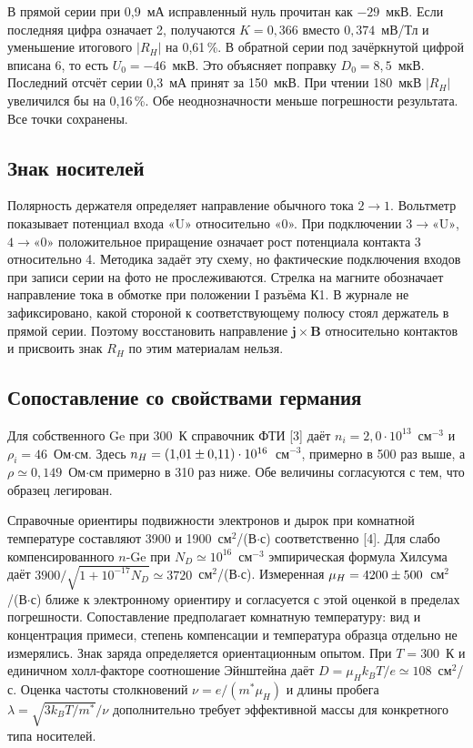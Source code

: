 \documentclass[a4paper,12pt]{article}
\begin{document}
В прямой серии при 0,9~мА исправленный нуль прочитан как $-29$~мкВ. Если последняя цифра означает 2, получаются $K=0{,}366$ вместо $0{,}374$~мВ/Тл и уменьшение итогового $|R_H|$ на 0,61\,\%. В обратной серии под зачёркнутой цифрой вписана 6, то есть $U_0=-46$~мкВ. Это объясняет поправку $D_0=8{,}5$~мкВ. Последний отсчёт серии 0,3~мА принят за 150~мкВ. При чтении 180~мкВ $|R_H|$ увеличился бы на 0,16\,\%. Обе неоднозначности меньше погрешности результата. Все точки сохранены.

\subsection*{Знак носителей}
Полярность держателя определяет направление обычного тока $2\to1$. Вольтметр показывает потенциал входа «U» относительно «0». При подключении $3\to\text{«U»}$, $4\to\text{«0»}$ положительное приращение означает рост потенциала контакта 3 относительно 4. Методика задаёт эту схему, но фактические подключения входов при записи серии на фото не прослеживаются. Стрелка на магните обозначает направление тока в обмотке при положении I разъёма К1. В журнале не зафиксировано, какой стороной к соответствующему полюсу стоял держатель в прямой серии. Поэтому восстановить направление $\mathbf j\times\mathbf B$ относительно контактов и присвоить знак $R_H$ по этим материалам нельзя.

\subsection*{Сопоставление со свойствами германия}
Для собственного Ge при 300~К справочник ФТИ [3] даёт $n_i=2{,}0\cdot10^{13}$~см$^{-3}$ и $\rho_i=46$~Ом$\cdot$см. Здесь $n_H=(1{,}01 \pm 0{,}11)\cdot10^{16}$~см$^{-3}$, примерно в 500 раз выше, а $\rho\simeq0{,}149$~Ом$\cdot$см примерно в 310 раз ниже. Обе величины согласуются с тем, что образец легирован.

Справочные ориентиры подвижности электронов и дырок при комнатной температуре составляют 3900 и 1900~см$^2$/(В$\cdot$с) соответственно [4]. Для слабо компенсированного $n$-Ge при $N_D\simeq10^{16}$~см$^{-3}$ эмпирическая формула Хилсума даёт $3900/\sqrt{1+10^{-17}N_D}\simeq3720$~см$^2$/(В$\cdot$с). Измеренная $\mu_H=4200 \pm 500$~см$^2$/(В$\cdot$с) ближе к электронному ориентиру и согласуется с этой оценкой в пределах погрешности. Сопоставление предполагает комнатную температуру: вид и концентрация примеси, степень компенсации и температура образца отдельно не измерялись. Знак заряда определяется ориентационным опытом. При $T=300$~К и единичном холл-факторе соотношение Эйнштейна даёт $D=\mu_H k_BT/e\simeq108$~см$^2$/с. Оценка частоты столкновений $\nu=e/(m^*\mu_H)$ и длины пробега $\lambda=\sqrt{3k_BT/m^*}/\nu$ дополнительно требует эффективной массы для конкретного типа носителей.
\end{document}
